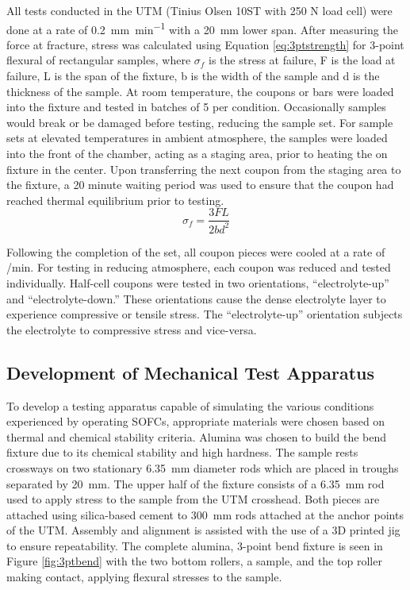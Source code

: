     All tests conducted in the UTM (Tinius Olsen 10ST with 250 N load cell) were done at a rate of \SI{0.2}{\milli\meter\per\minute} with a \SI{20}{\milli\meter} lower span.
    After measuring the force at fracture, stress was calculated using Equation \ref{eq:3ptstrength}
    for 3-point flexural of rectangular samples, where \(\sigma_{f}\) is the stress at failure, F is the load at failure, L is the span of the fixture, b is the width of the sample and d is the thickness of the sample.
    At room temperature, the coupons or bars were loaded into the fixture and tested in batches of 5 per condition.
    Occasionally samples would break or be damaged before testing, reducing the sample set.
    For sample sets at elevated temperatures in ambient atmosphere, the samples were loaded into the front of the chamber, acting as a staging area,
    prior to heating the on fixture in the center.
    Upon transferring the next coupon from the staging area to the fixture, a 20 minute waiting period was used to ensure that the coupon had reached thermal equilibrium prior to testing.
    \begin{equation}
        \sigma_{f} = \frac{3FL}{2bd^{2}}
        \label{eq:3ptstrength}
    \end{equation}

    Following the completion of the set, all coupon pieces were cooled at a rate of /min.
    For testing in reducing atmosphere, each coupon was reduced and tested individually.
    Half-cell coupons were tested in two orientations, ``electrolyte-up'' and ``electrolyte-down.'' These orientations cause the dense electrolyte layer to experience compressive or tensile stress.
    The ``electrolyte-up'' orientation subjects the electrolyte to compressive stress and vice-versa.

    \subsection{Development of Mechanical Test Apparatus}
        To develop a testing apparatus capable of simulating the various conditions experienced by operating SOFCs, appropriate materials were chosen based on thermal and chemical stability criteria.
        Alumina was chosen to build the bend fixture due to its chemical stability and high hardness.
        The sample rests crossways on two stationary \SI{6.35}{\milli\meter} diameter rods which are placed in troughs separated by \SI{20}{\milli\meter}.
        The upper half of the fixture consists of a \SI{6.35}{\milli\meter} rod used to apply stress to the sample from the UTM crosshead.
        Both pieces are attached using silica-based cement to \SI{300}{\milli\meter} rods attached at the anchor points of the UTM.
        Assembly and alignment is assisted with the use of a 3D printed jig to ensure repeatability.
        The complete alumina, 3-point bend fixture is seen in Figure \ref{fig:3ptbend} with the two bottom rollers, a sample, and the top roller making contact, applying flexural stresses to the sample.


